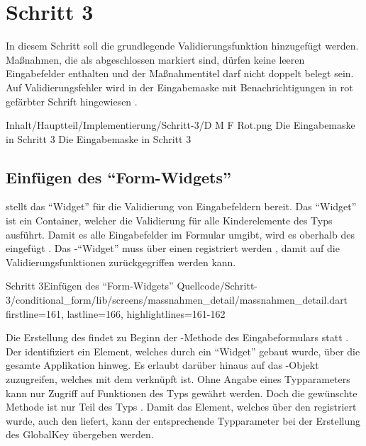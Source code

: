 \chapter{Schritt 3}
\label{chap:Schritt-3}


In diesem Schritt soll die grundlegende Validierungsfunktion hinzugefügt werden.
Maßnahmen, die als abgeschlossen markiert sind, dürfen keine leeren Eingabefelder enthalten und der Maßnahmentitel darf nicht doppelt belegt sein.
Auf Validierungsfehler wird in der Eingabemaske mit Benachrichtigungen in rot gefärbter Schrift hingewiesen \Abb{\ref{fig:Schritt3Eingabemaske}}.
  
  \begin{alexfigure}{Inhalt/Hauptteil/Implementierung/Schritt-3/D M F Rot.png}
    {Die Eingabemaske in Schritt 3}
    {Die Eingabemaske in Schritt 3}
  
    \label{fig:Schritt3Eingabemaske}
  
  \end{alexfigure}



\section{Einfügen des \enquote{Form-Widgets}}
 stellt das \enquote{Widget}  für die Validierung von Eingabefeldern bereit.
Das \enquote{Widget}  ist ein Container, welcher die Validierung für alle Kinderelemente des Typs  ausführt.
Damit es alle Eingabefelder im Formular umgibt, wird es oberhalb des  eingefügt .
Das -\enquote{Widget} muss über einen  registriert werden , damit auf die Validierungsfunktionen zurückgegriffen werden kann.

\begin{alexlisting}{Schritt 3}{Einfügen des \enquote{Form-Widgets}}
    {Quellcode/Schritt-3/conditional_form/lib/screens/massnahmen_detail/massnahmen_detail.dart}
    {firstline=161, lastline=166, highlightlines={161-162}}
    \label{lst:Schritt3Form}
\end{alexlisting}
  
Die Erstellung des  findet zu Beginn der -Methode des Eingabeformulars statt .
Der  identifiziert ein Element, welches durch ein \enquote{Widget} gebaut wurde, über die gesamte Applikation hinweg.
Es erlaubt darüber hinaus auf das -Objekt zuzugreifen, welches mit dem  verknüpft ist.
Ohne Angabe eines Typparameters kann nur Zugriff auf Funktionen des Typs  gewährt werden.
Doch die gewünschte Methode  ist nur Teil des Typs .
Damit das Element, welches über den  registriert wurde, auch den  liefert, kann der entsprechende Typparameter  bei der Erstellung des GlobalKey übergeben werden.

